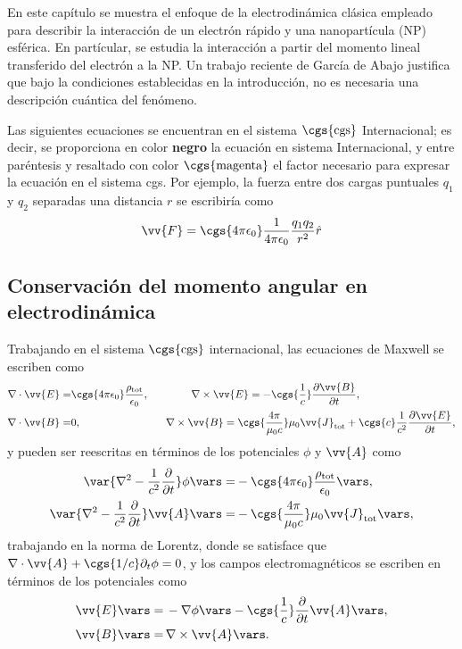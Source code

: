 En este capítulo se muestra el enfoque de la electrodinámica clásica empleado para describir la interacción de un electrón rápido y una nanopartícula (NP) esférica. En partícular, se estudia la interacción a partir del momento lineal transferido del electrón a la NP. Un trabajo reciente de García de Abajo \cite{deabajo2021optical} justifica que bajo la condiciones establecidas en la introducción, no es necesaria una descripción cuántica del fenómeno.

Las siguientes ecuaciones se encuentran en el sistema $\cgs{\text{cgs}}$ Internacional; es decir, se proporciona en color \textbf{negro} la ecuación en sistema Internacional, y entre paréntesis y resaltado con color $\cgs{\text{magenta}}$ el factor necesario para expresar la ecuación en el sistema cgs. Por ejemplo, la fuerza entre dos cargas puntuales $q_1$ y $q_2$ separadas una distancia $r$ se escribiría como
\begin{equation}
\vv{F} = \cgs{4\pi\epsilon_0}\frac{1}{4\pi\epsilon_0} \frac{q_1 q_2}{r^2} \hat{r}
\end{equation}

\subsection{Conservación del momento angular en electrodinámica}
Trabajando en el sistema $\cgs{\text{cgs}}$ internacional, las ecuaciones de Maxwell se escriben como \cite{jackson}
\begin{align}
\nabla\cdot\vv{E} =& \cgs{4\pi\epsilon_0}\frac{\rho_{\text{tot}}}{\epsilon_0}, \qquad \qquad \nabla\times\vv{E}=-\cgs{\frac{1}{c}}\frac{\partial\vv{B}}{\partial t}, \nonumber \\
\nabla\cdot\vv{B} =& 0, \qquad \qquad \qquad \qquad \nabla\times\vv{B}=\cgs{\frac{4\pi}{\mu_0 c}}\mu_0\vv{J}_{\text{tot}}+\cgs{c}\frac{1}{c^2}\frac{\partial\vv{E}}{\partial t},
\label{eq: Maxwell equations}
\end{align}
y pueden ser reescritas en términos de los potenciales $\phi$ y $\vv{A}$ como \cite{jackson}
\begin{align}
\var{\nabla^2 -\frac{1}{c^2}\frac{\partial}{\partial t}}\phi\vars =& - \cgs{4\pi\epsilon_0} \frac{\rho_{\text{tot}}}{\epsilon_0}\vars, \label{eq: scalar potential}\\
\var{\nabla^2 -\frac{1}{c^2}\frac{\partial}{\partial t}}\vv{A}\vars =& - \cgs{\frac{4\pi}{\mu_0 c}}\mu_0 \vv{J}_{\text{tot}}\vars,\label{eq: vector potential}
\end{align}
trabajando en la norma de Lorentz, donde se satisface que $\nabla\cdot\vv{A}+\cgs{1/c}\partial_t \phi =0$, y los campos electromagnéticos se escriben en términos de los potenciales como
\begin{align}
\vv{E}\vars =& \, -\nabla\phi\vars - \cgs{\frac{1}{c}}\frac{\partial}{\partial t}\vv{A}\vars, \label{eq: E field potentials}\\
\vv{B}\vars =& \, \nabla\times\vv{A}\vars. \label{eq: B field potentials}
\end{align}

